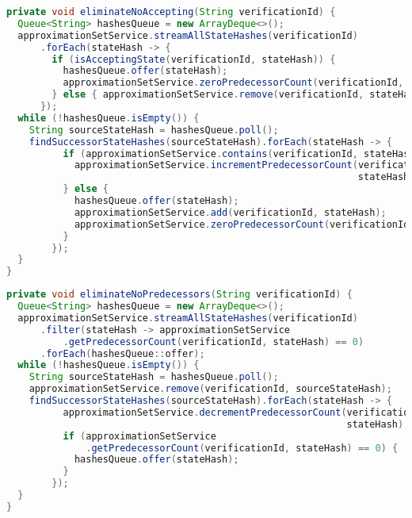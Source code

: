 \begin{minipage}{\linewidth}
\begin{lstlisting}[caption={Implementacja funkcji usuwającej stany nieakceptujące ze zbioru.},captionpos=b,label={lst:eliminateNoAcceptingStates},language=Java]
private void eliminateNoAccepting(String verificationId) {
  Queue<String> hashesQueue = new ArrayDeque<>();
  approximationSetService.streamAllStateHashes(verificationId)
      .forEach(stateHash -> {
        if (isAcceptingState(verificationId, stateHash)) {
          hashesQueue.offer(stateHash);
          approximationSetService.zeroPredecessorCount(verificationId, stateHash);
        } else { approximationSetService.remove(verificationId, stateHash); }
      });
  while (!hashesQueue.isEmpty()) {
    String sourceStateHash = hashesQueue.poll();
    findSuccessorStateHashes(sourceStateHash).forEach(stateHash -> {
          if (approximationSetService.contains(verificationId, stateHash)) {
            approximationSetService.incrementPredecessorCount(verificationId,
                                                              stateHash);
          } else {
            hashesQueue.offer(stateHash);
            approximationSetService.add(verificationId, stateHash);
            approximationSetService.zeroPredecessorCount(verificationId, stateHash);
          }
        });
  }
}
\end{lstlisting}
\end{minipage}
\begin{minipage}{\linewidth}
\begin{lstlisting}[caption={Implementacja funkcji usuwającej stany niemające poprzedników ze zbioru.},captionpos=b,label={lst:eliminateNoPredecessorsStates},language=Java]
private void eliminateNoPredecessors(String verificationId) {
  Queue<String> hashesQueue = new ArrayDeque<>();
  approximationSetService.streamAllStateHashes(verificationId)
      .filter(stateHash -> approximationSetService
          .getPredecessorCount(verificationId, stateHash) == 0)
      .forEach(hashesQueue::offer);
  while (!hashesQueue.isEmpty()) {
    String sourceStateHash = hashesQueue.poll();
    approximationSetService.remove(verificationId, sourceStateHash);
    findSuccessorStateHashes(sourceStateHash).forEach(stateHash -> {
          approximationSetService.decrementPredecessorCount(verificationId
                                                            stateHash);
          if (approximationSetService
              .getPredecessorCount(verificationId, stateHash) == 0) {
            hashesQueue.offer(stateHash);
          }
        });
  }
}
\end{lstlisting}
\end{minipage}


